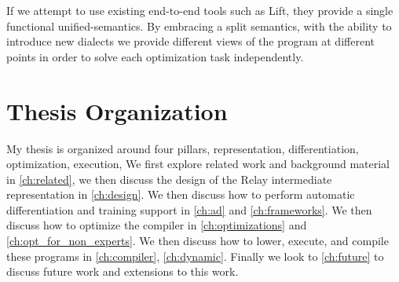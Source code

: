 If we attempt to use existing end-to-end tools such as Lift, they provide a single functional unified-semantics. By embracing a split semantics, with the ability to introduce new dialects we provide different views of the program at different points in order to solve each optimization task independently.


\section{Thesis Organization}

My thesis is organized around four pillars, representation, differentiation, optimization, execution,
We first explore related work and background material
  in \ref{ch:related}, we then discuss the design of the Relay intermediate representation in \ref{ch:design}.
We then discuss how to perform automatic differentiation and training support in \ref{ch:ad} and
  \ref{ch:frameworks}.
We then discuss how to optimize the compiler in \ref{ch:optimizations} and \ref{ch:opt_for_non_experts}.
We then discuss how to lower, execute, and compile these programs in
\ref{ch:compiler}, \ref{ch:dynamic}.
Finally we look to \ref{ch:future} to discuss future work and extensions to this work.






